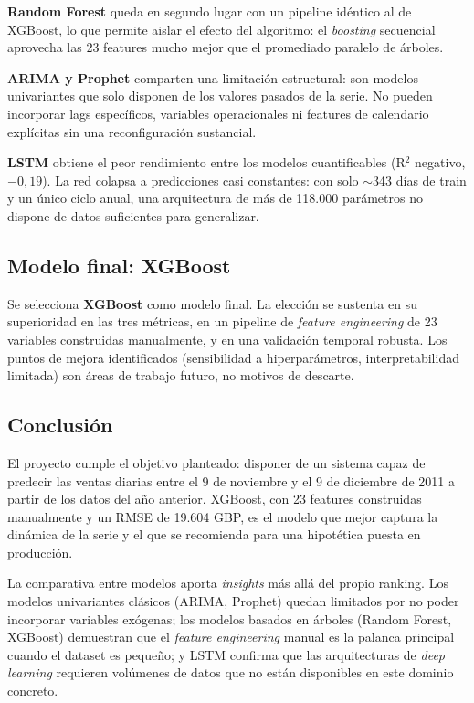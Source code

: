 \documentclass[11pt,a4paper]{article}
\begin{document}
\textbf{Random Forest} queda en segundo lugar con un pipeline idéntico al de XGBoost, lo que permite aislar el efecto del algoritmo: el \textit{boosting} secuencial aprovecha las 23 features mucho mejor que el promediado paralelo de árboles.

\textbf{ARIMA y Prophet} comparten una limitación estructural: son modelos univariantes que solo disponen de los valores pasados de la serie. No pueden incorporar lags específicos, variables operacionales ni features de calendario explícitas sin una reconfiguración sustancial.

\textbf{LSTM} obtiene el peor rendimiento entre los modelos cuantificables (R$^2$ negativo, $-0,19$). La red colapsa a predicciones casi constantes: con solo $\sim$343 días de train y un único ciclo anual, una arquitectura de más de 118.000 parámetros no dispone de datos suficientes para generalizar.

\subsection{Modelo final: XGBoost}

Se selecciona \textbf{XGBoost} como modelo final. La elección se sustenta en su superioridad en las tres métricas, en un pipeline de \textit{feature engineering} de 23 variables construidas manualmente, y en una validación temporal robusta. Los puntos de mejora identificados (sensibilidad a hiperparámetros, interpretabilidad limitada) son áreas de trabajo futuro, no motivos de descarte.

\subsection{Conclusión}

El proyecto cumple el objetivo planteado: disponer de un sistema capaz de predecir las ventas diarias entre el 9 de noviembre y el 9 de diciembre de 2011 a partir de los datos del año anterior. XGBoost, con 23 features construidas manualmente y un RMSE de 19.604 GBP, es el modelo que mejor captura la dinámica de la serie y el que se recomienda para una hipotética puesta en producción.

La comparativa entre modelos aporta \textit{insights} más allá del propio ranking. Los modelos univariantes clásicos (ARIMA, Prophet) quedan limitados por no poder incorporar variables exógenas; los modelos basados en árboles (Random Forest, XGBoost) demuestran que el \textit{feature engineering} manual es la palanca principal cuando el dataset es pequeño; y LSTM confirma que las arquitecturas de \textit{deep learning} requieren volúmenes de datos que no están disponibles en este dominio concreto.
\end{document}
